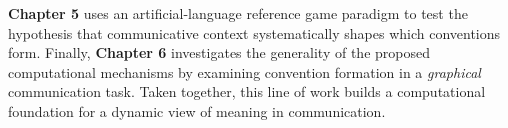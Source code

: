 \textbf{Chapter 5} uses an artificial-language reference game paradigm to test the hypothesis that communicative context systematically shapes which conventions form.
Finally, \textbf{Chapter 6} investigates the generality of the proposed computational mechanisms by examining convention formation in a \emph{graphical} communication task.
Taken together, this line of work builds a computational foundation for a dynamic view of meaning in communication.%

